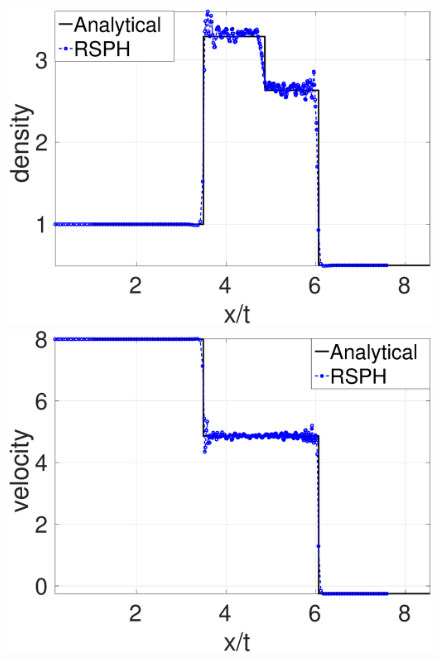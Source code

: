 \begin{figure}
    \centering
    \begin{minipage}{.415\textwidth}
        \centering
        \includegraphics[width=0.99 \textwidth]{./Chapter-4/Figures/double_shock/Dshock-RCM-rho-Rp6}
    \end{minipage}%
    \begin{minipage}{.415 \textwidth}
        \centering
        \includegraphics[width=0.99 \textwidth]{./Chapter-4/Figures/double_shock/Dshock-RCM-v-Rp6}
    \end{minipage}%
    \\
    \begin{minipage}{.415\textwidth}
        \centering

\end{minipage}
\end{figure}
